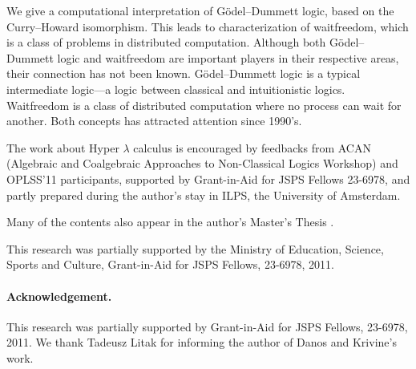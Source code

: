 \documentclass[doctor]{iscs-thesis}
\date{\fix{XXX}}
\begin{document}
\begin{eabstract}
 We give a computational interpretation of G\"odel--Dummett logic, based
 on the Curry--Howard isomorphism.  This leads to characterization
 of waitfreedom, which is a class of problems in distributed
 computation.  Although both G\"odel--Dummett logic and waitfreedom are
 important players in their respective areas, their connection has not
 been known.  G\"odel--Dummett logic is a typical intermediate logic---a
 logic between classical and intuitionistic logics.
 Waitfreedom is a class of distributed computation where no process can
 wait for another.  Both concepts has attracted attention since 1990's.
\end{eabstract}

\begin{jabstract}
 $B%
 $B$k!#$9$k$H!"J,;67W;;$NLdBj%
 $B%
 $B$3$l$i$N4XO"$O!"$3$l$^$GCN$i$l$F$$$J$+$C$?!#(B
\end{jabstract}

\maketitle

\begin{acknowledge}
The work about Hyper $\lambda$ calculus is encouraged by feedbacks from
ACAN (Algebraic and
Coalgebraic
Approaches to
Non-Classical Logics Workshop) and OPLSS'11 participants,
supported by Grant-in-Aid for JSPS Fellows 23-6978,
and partly prepared during the author's stay in
ILPS, the University of Amsterdam.


Many of the contents also appear in the author's Master's Thesis .
\end{acknowledge}

\frontmatter
\tableofcontents

\listoffigures
\listoftables

\mainmatter

%
%
%

%


This research was partially supported by the Ministry of Education,
Science, Sports and Culture, Grant-in-Aid for JSPS Fellows, 23-6978, 2011.






\paragraph{Acknowledgement.}
This research was partially supported by
Grant-in-Aid for JSPS Fellows, 23-6978, 2011.
We thank Tadeusz Litak for informing the author of
Danos and Krivine's work.

\appendix



\end{document}
